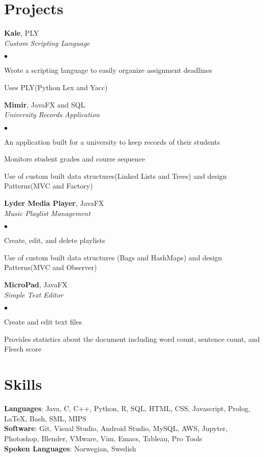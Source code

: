 \documentclass[margin,line]{res}
\newenvironment{list2}{
  \begin{list}{$\bullet$}{
      \setlength{\itemsep}{0in}
      \setlength{\parsep}{0in} \setlength{\parskip}{0in}
      \setlength{\topsep}{0in} \setlength{\partopsep}{0in}
      \setlength{\leftmargin}{0.2in}}}{\end{list}}
\begin{document}
\begin{resume}
\section{\sc Projects}
{\bf Kale}, PLY\\
{\em Custom Scripting Language}
\begin{list2}
\item Wrote a scripting language to easily organize assignment deadlines
\item Uses PLY(Python Lex and Yacc) 
\end{list2}
{\bf Mimir}, JavaFX and SQL\\
{\em University Records Application}
\begin{list2}
\item An application built for a university to keep records of their students
\item Monitors student grades and course sequence
\item Use of custom built data structures(Linked Lists and Trees) and design Patterns(MVC and Factory)
\end{list2}
{\bf Lyder Media Player}, JavaFX\\
{\em Music Playlist Management}
\begin{list2}
\item Create, edit, and delete playlists
\item Use of custom built data structures (Bags and HashMaps) and design Patterns(MVC and Observer)
\end{list2}
{\bf MicroPad}, JavaFX\\
{\em Simple Text Editor}
\begin{list2}
\item Create and edit text files
\item Provides statistics about the document including word count, sentence count, and Flesch score
\end{list2}

\section{\sc Skills}
{\bf Languages}:  Java, C, C++, Python, R, SQL, HTML, CSS, Javascript, Prolog, {\LaTeX}, Bash, SML, MIPS\\
{\bf Software}: Git, Visual Studio, Android Studio, MySQL, AWS, Jupyter, Photoshop, Blender, VMware, Vim, Emacs, Tableau, Pro Tools\\
{\bf Spoken Languages}: Norwegian, Swedish
\end{resume}
\end{document}
